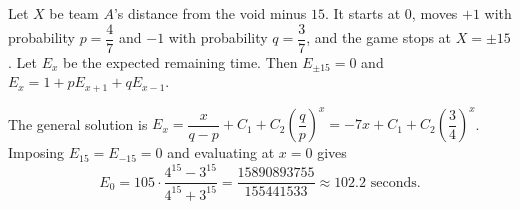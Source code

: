 Let $X$ be team $A$'s distance from the void minus $15$. It starts at $0$, moves $+1$ with probability $p=\dfrac47$ and $-1$ with probability $q=\dfrac37$, and the game stops at $X=\pm15$. Let $E_x$ be the expected remaining time. Then $E_{\pm15}=0$ and $E_x=1+pE_{x+1}+qE_{x-1}$.

The general solution is $E_x=\dfrac{x}{q-p}+C_1+C_2\left(\dfrac qp\right)^x=-7x+C_1+C_2\left(\dfrac34\right)^x$. Imposing $E_{15}=E_{-15}=0$ and evaluating at $x=0$ gives
\[E_0=105\cdot\dfrac{4^{15}-3^{15}}{4^{15}+3^{15}}=\dfrac{15890893755}{155441533}\approx\boxed{102.2\text{ seconds}}.\]
